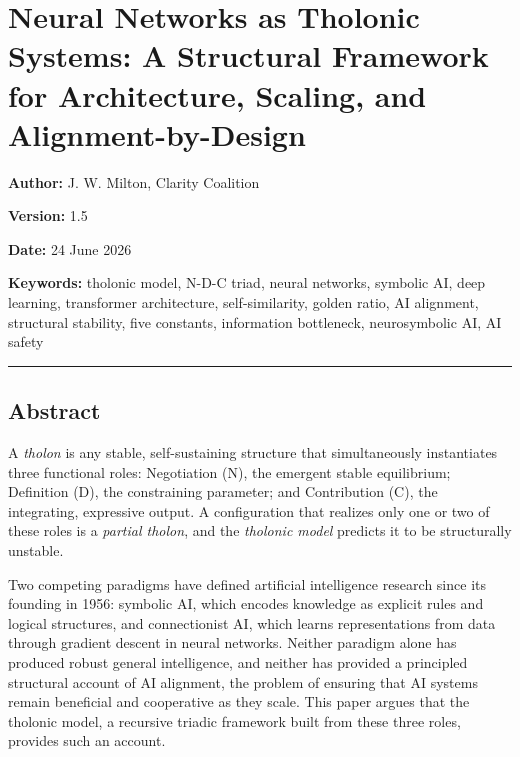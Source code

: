 \documentclass[
  11pt,
  letterpaper,
]{article}
\author{}
\date{}
\begin{document}
\section{Neural Networks as Tholonic Systems: A Structural Framework for
Architecture, Scaling, and
Alignment-by-Design}\label{neural-networks-as-tholonic-systems-a-structural-framework-for-architecture-scaling-and-alignment-by-design}

\textbf{Author:} J. W. Milton, Clarity Coalition

\textbf{Version:} 1.5

\textbf{Date:} 24 June 2026

\textbf{Keywords:} tholonic model, N-D-C triad, neural networks,
symbolic AI, deep learning, transformer architecture, self-similarity,
golden ratio, AI alignment, structural stability, five constants,
information bottleneck, neurosymbolic AI, AI safety

\begin{center}\rule{0.5\linewidth}{0.5pt}\end{center}

\subsection{Abstract}\label{abstract}

A \emph{tholon} is any stable, self-sustaining structure that
simultaneously instantiates three functional roles: Negotiation (N), the
emergent stable equilibrium; Definition (D), the constraining parameter;
and Contribution (C), the integrating, expressive output. A
configuration that realizes only one or two of these roles is a
\emph{partial tholon}, and the \emph{tholonic model} predicts it to be
structurally unstable.

Two competing paradigms have defined artificial intelligence research
since its founding in 1956: symbolic AI, which encodes knowledge as
explicit rules and logical structures, and connectionist AI, which
learns representations from data through gradient descent in neural
networks. Neither paradigm alone has produced robust general
intelligence, and neither has provided a principled structural account
of AI alignment, the problem of ensuring that AI systems remain
beneficial and cooperative as they scale. This paper argues that the
tholonic model, a recursive triadic framework built from these three
roles, provides such an account.
\end{document}
